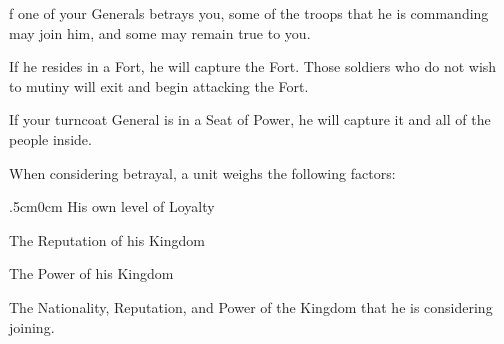 f one of your Generals betrays you, some of the troops that he is commanding may join him, and some may remain true to you.

If he resides in a Fort, he will capture the Fort. Those soldiers who do not wish to mutiny will exit and begin attacking the Fort.

If your turncoat General is in a Seat of Power, he will capture it and all of the people inside.

When considering betrayal, a unit weighs the following factors:

\begin{changemargin}{.5cm}{0cm}
His own level of Loyalty

The Reputation of his Kingdom

The Power of his Kingdom

The Nationality, Reputation, and Power of the Kingdom that he is considering joining.
\end{changemargin}